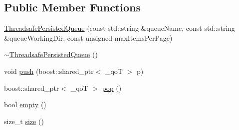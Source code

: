 \subsection*{Public Member Functions}
\begin{DoxyCompactItemize}
\item 
\hyperlink{classkisscpp_1_1_threadsafe_persisted_queue_a97cf702d8b42b4c8fe0b5322dd400778}{Threadsafe\-Persisted\-Queue} (const std\-::string \&queue\-Name, const std\-::string \&queue\-Working\-Dir, const unsigned max\-Items\-Per\-Page)
\item 
\hyperlink{classkisscpp_1_1_threadsafe_persisted_queue_aa5501a8a59b8c72d9684c4c956cd1de8}{$\sim$\-Threadsafe\-Persisted\-Queue} ()
\item 
void \hyperlink{classkisscpp_1_1_threadsafe_persisted_queue_ab4be3f974ebbad4fe5ca9c567b0a7de4}{push} (boost\-::shared\-\_\-ptr$<$ \-\_\-qo\-T $>$ p)
\item 
boost\-::shared\-\_\-ptr$<$ \-\_\-qo\-T $>$ \hyperlink{classkisscpp_1_1_threadsafe_persisted_queue_ac641d52fdd2c291f1ae4799e09ef8933}{pop} ()
\item 
bool \hyperlink{classkisscpp_1_1_threadsafe_persisted_queue_a5acc045d1b5650aab56b1ea33372f007}{empty} ()
\item 
size\-\_\-t \hyperlink{classkisscpp_1_1_threadsafe_persisted_queue_ad534f615da86716d4cf8a10d32fe11ce}{size} ()
\end{DoxyCompactItemize}


